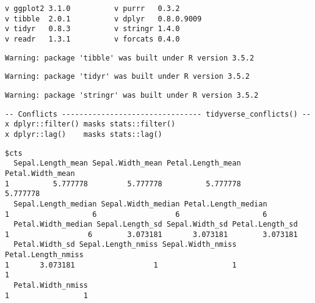 \documentclass[12pt,letterpaperpaper,openany]{book}
\begin{document}
\begin{verbatim}
v ggplot2 3.1.0          v purrr   0.3.2     
v tibble  2.0.1          v dplyr   0.8.0.9009
v tidyr   0.8.3          v stringr 1.4.0     
v readr   1.3.1          v forcats 0.4.0     
\end{verbatim}

\begin{verbatim}
Warning: package 'tibble' was built under R version 3.5.2
\end{verbatim}

\begin{verbatim}
Warning: package 'tidyr' was built under R version 3.5.2
\end{verbatim}

\begin{verbatim}
Warning: package 'stringr' was built under R version 3.5.2
\end{verbatim}

\begin{verbatim}
-- Conflicts -------------------------------- tidyverse_conflicts() --
x dplyr::filter() masks stats::filter()
x dplyr::lag()    masks stats::lag()
\end{verbatim}

\begin{verbatim}
$cts
  Sepal.Length_mean Sepal.Width_mean Petal.Length_mean Petal.Width_mean
1          5.777778         5.777778          5.777778         5.777778
  Sepal.Length_median Sepal.Width_median Petal.Length_median
1                   6                  6                   6
  Petal.Width_median Sepal.Length_sd Sepal.Width_sd Petal.Length_sd
1                  6        3.073181       3.073181        3.073181
  Petal.Width_sd Sepal.Length_nmiss Sepal.Width_nmiss Petal.Length_nmiss
1       3.073181                  1                 1                  1
  Petal.Width_nmiss
1                 1
\end{verbatim}
\end{document}
